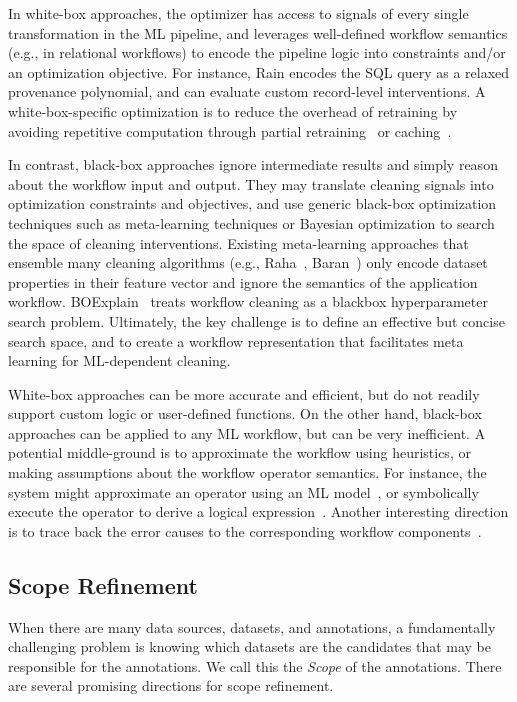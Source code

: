 \documentclass[11pt,dvipsnames]{article}
\begin{document}
In white-box approaches, the optimizer has access to signals of every single transformation in the ML pipeline, and leverages well-defined workflow semantics (e.g., in relational workflows) to encode the pipeline logic into constraints and/or an optimization objective. For instance, Rain encodes the SQL query as a relaxed provenance polynomial, and can evaluate custom record-level interventions.
A white-box-specific optimization is to reduce the overhead of retraining by avoiding repetitive computation through partial retraining~\cite{DeltaGrad,IncrementallyUpdatingRegression} or caching~\cite{Helix, SystemDS}.

In contrast, black-box approaches ignore intermediate results and simply reason about the workflow input and output.  They may translate cleaning signals into optimization constraints and objectives, and use generic black-box optimization techniques such as meta-learning techniques or Bayesian optimization to search the space of cleaning interventions. Existing meta-learning approaches that ensemble many cleaning algorithms (e.g., Raha~\cite{Raha}, Baran~\cite{Baran}) only encode dataset properties in their feature vector and ignore the semantics of the application workflow.  BOExplain~\cite{boexplain} treats workflow cleaning as a blackbox hyperparameter search problem.
Ultimately, the key challenge is to define an effective but concise search space, and to create a workflow representation that facilitates meta learning for ML-dependent cleaning. 


White-box approaches can be more accurate and efficient, but do not readily support custom logic or user-defined functions.  
On the other hand, black-box approaches can be applied to any ML workflow, but can be very inefficient.  
A potential middle-ground is to approximate the workflow using heuristics, or making assumptions about the workflow operator semantics.   For instance, the system might approximate an operator using an ML model~\cite{CPClean}, or symbolically execute the operator to derive a logical expression~\cite{Froid,Acorn}.  
Another interesting direction is to trace back the error causes to the corresponding workflow components~\cite{DataXRay}. 



\subsection{Scope Refinement}

When there are many data sources, datasets, and annotations, a fundamentally challenging problem is knowing which datasets are the candidates that may be responsible for the annotations. We call this the {\it Scope} of the annotations.  There are several promising directions for scope refinement.
\end{document}
